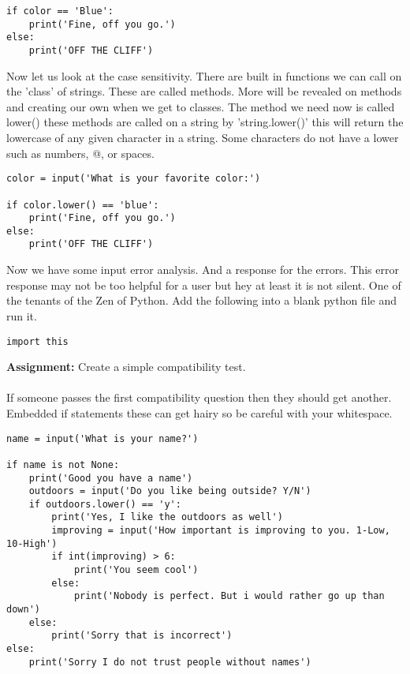 \documentclass[../main.tex]{subfiles}
\begin{document}
\begin{lstlisting}
if color == 'Blue':
    print('Fine, off you go.')
else:
    print('OFF THE CLIFF')
\end{lstlisting}
Now let us look at the case sensitivity. There are built in functions we can call on the 'class' of strings. These are called methods. More will be revealed on methods and creating our own when we get to classes. The method we need now is called lower() these methods are called on a string by 'string.lower()' this will return the lowercase of any given character in a string. Some characters do not have a lower such as numbers, @, or spaces.
\begin{lstlisting}
color = input('What is your favorite color:')

if color.lower() == 'blue':
    print('Fine, off you go.')
else:
    print('OFF THE CLIFF')
\end{lstlisting}
Now we have some input error analysis. And a response for the errors. This error response may not be too helpful for a user but hey at least it is not silent. One of the tenants of the Zen of Python. Add the following into a blank python file and run it.
\begin{lstlisting}
import this
\end{lstlisting}
\textbf{Assignment:}
Create a simple compatibility test.\\
\\
If someone passes the first compatibility question then they should get another. Embedded if statements these can get hairy so be careful with your whitespace.\\
\begin{lstlisting}[caption=Example]
name = input('What is your name?')

if name is not None:
    print('Good you have a name')
    outdoors = input('Do you like being outside? Y/N')
    if outdoors.lower() == 'y':
        print('Yes, I like the outdoors as well')
        improving = input('How important is improving to you. 1-Low, 10-High')
        if int(improving) > 6:
            print('You seem cool')
        else:
            print('Nobody is perfect. But i would rather go up than down')
    else:
        print('Sorry that is incorrect')
else:
    print('Sorry I do not trust people without names')
\end{lstlisting}
\newpage
\end{document}

